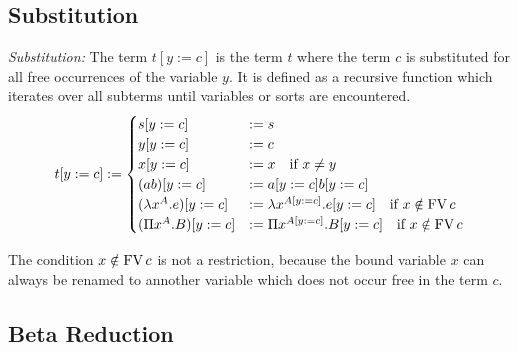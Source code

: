 \subsection{Substitution}


\begin{definition}
    \emph{Substitution:}
    The term $t[y:=c]$ is the term $t$ where the term $c$ is substituted for all
    free occurrences of the variable $y$. It is defined as a recursive function
    which iterates over all subterms until variables or sorts are encountered.
    $$
    t[y:=c] :=
        \begin{cases}
            s[y:=c] &:= s

            \\

            y[y:=c] &:= c

            \\

            x[y:=c] &:= x \quad \text{if } x \ne y

            \\

            (a b)[y:=c] &:= a[y:=c] b[y:=c]

            \\

            (\lambda x^A . e)[y:=c]
            &:=
            \lambda x^{A[y:=c]}. e[y:=c]
                \quad \text{if } x \notin \FV c

            \\

            (\Pi x^A . B)[y:=c]
            &:=
            \Pi x^{A[y:=c]}. B[y:=c]
                \quad \text{if } x \notin \FV c
        \end{cases}
    $$
\end{definition}
The condition $x \notin \FV c$ is not a restriction, because the bound variable
$x$ can always be renamed to annother variable which does not occur free in the
term $c$.





\subsection{Beta Reduction}


